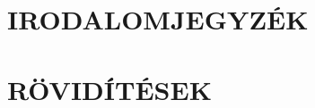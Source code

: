 %












\clearpage
\section{IRODALOMJEGYZÉK}
\printbibliography[heading=none]

\clearpage
\renewcommand{\listfigurename}{ÁBRAJEGYZÉK}
\listoffigures

\clearpage
\renewcommand{\listtablename}{TÁBLAJEGYZÉK}
\listoftables

\clearpage
\section{RÖVIDÍTÉSEK}







